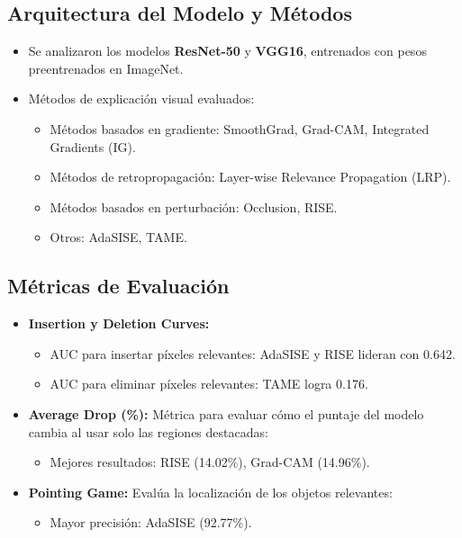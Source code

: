 \documentclass{report}
\begin{document}
\subsection{Arquitectura del Modelo y Métodos}
\begin{itemize}
    \item Se analizaron los modelos \textbf{ResNet-50} y \textbf{VGG16}, entrenados con pesos preentrenados en ImageNet.
    \item Métodos de explicación visual evaluados:
    \begin{itemize}
        \item Métodos basados en gradiente: SmoothGrad, Grad-CAM, Integrated Gradients (IG).
        \item Métodos de retropropagación: Layer-wise Relevance Propagation (LRP).
        \item Métodos basados en perturbación: Occlusion, RISE.
        \item Otros: AdaSISE, TAME.
    \end{itemize}
\end{itemize}

\subsection{Métricas de Evaluación}
\begin{itemize}
    \item \textbf{Insertion y Deletion Curves:}
    \begin{itemize}
        \item AUC para insertar píxeles relevantes: AdaSISE y RISE lideran con 0.642.
        \item AUC para eliminar píxeles relevantes: TAME logra 0.176.
    \end{itemize}
    \item \textbf{Average Drop (\%):} Métrica para evaluar cómo el puntaje del modelo cambia al usar solo las regiones destacadas:
    \begin{itemize}
        \item Mejores resultados: RISE (14.02\%), Grad-CAM (14.96\%).
    \end{itemize}
    \item \textbf{Pointing Game:} Evalúa la localización de los objetos relevantes:
    \begin{itemize}
        \item Mayor precisión: AdaSISE (92.77\%).
    \end{itemize}
\end{itemize}
\end{document}
